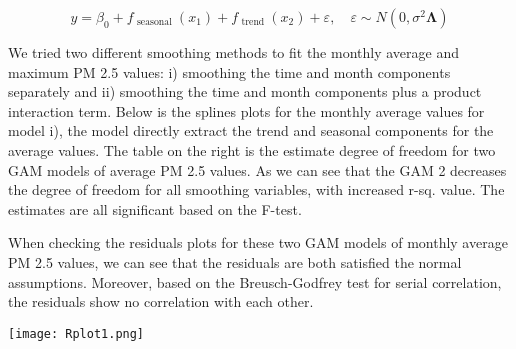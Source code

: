 \documentclass[11pt,]{article}
\begin{document}
$$
y=\beta_{0}+f_{\text { seasonal }}\left(x_{1}\right)+f_{\text { trend }}\left(x_{2}\right)+\varepsilon, \quad \varepsilon \sim N\left(0, \sigma^{2} \mathbf{\Lambda}\right)
$$

We tried two different smoothing methods to fit the monthly average and maximum PM 2.5 values: i) smoothing the time and month components separately and ii) smoothing the time and month components plus a product interaction term. Below is the splines plots for the monthly average values for model i), the model directly extract the trend and seasonal components for the average values. The table on the right is the estimate degree of freedom for two GAM models of average PM 2.5 values. As we can see that the GAM 2 decreases the degree of freedom for all smoothing variables, with increased r-sq. value. The estimates are all significant based on the F-test.

When checking the residuals plots for these two GAM models of monthly average PM 2.5 values, we can see that the residuals are both satisfied the normal assumptions. Moreover, based on the Breusch-Godfrey test for serial correlation, the residuals show no correlation with each other. 


\vspace{3mm}

\begin{minipage}{.45\linewidth}
\begin{flushleft}

{\texttt{[image: Rplot1.png]}}

\end{flushleft} 
\end{minipage}
\hfill
\begin{minipage}{.45\linewidth}
\begin{flushright} 

\begin{table}
\end{table}

\end{flushright} 
\end{minipage}
\end{document}
